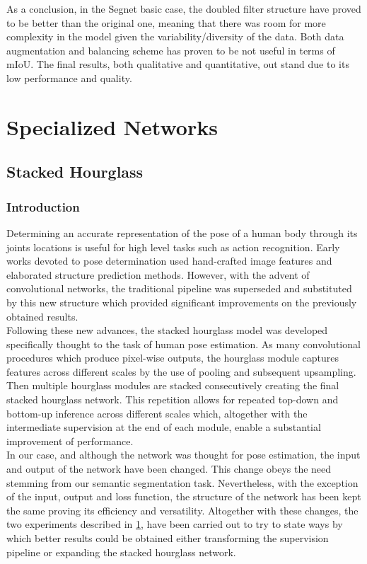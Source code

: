 \documentclass[12pt,a4paper]{article}
\begin{document}
As a conclusion, in the Segnet basic case, the doubled filter structure have proved to be better than the original one, meaning that there was room for more complexity in the model given the variability/diversity of the data. Both data augmentation and balancing scheme has proven to be not useful in terms of mIoU. The final results, both qualitative and quantitative, out stand due to its low performance and quality.\newline
 
 
\newpage
\section{Specialized Networks}\label{specificstudy}


\subsection{Stacked Hourglass}

\subsubsection{Introduction}

Determining an accurate representation of the pose of a human body through its joints locations is useful for high level tasks such as action recognition. Early works devoted to pose determination used hand-crafted image features and elaborated structure prediction methods. However, with the advent of convolutional networks, the traditional pipeline was superseded and substituted by this new structure which provided significant improvements on the previously obtained results.\\

Following these new advances, the stacked hourglass model was developed specifically thought to the task of human pose estimation. As many convolutional procedures which produce pixel-wise outputs, the hourglass module captures features across different scales by the use of pooling and subsequent upsampling. Then multiple hourglass modules are stacked consecutively creating the final stacked hourglass network. This repetition allows for repeated top-down and bottom-up inference across different scales which, altogether with the intermediate supervision at the end of each module, enable a substantial improvement of performance.\\

In our case, and although the network was thought for pose estimation, the input and output of the network have been changed. This change obeys the need stemming from our semantic segmentation task. Nevertheless, with the exception of the input, output and loss function, the structure of the network has been kept the same proving its efficiency and versatility. Altogether with these changes, the two experiments described in \ref{specificstudy}, have been carried out to try to state ways by which better results could be obtained either transforming the supervision pipeline or expanding the stacked hourglass network.\\
\end{document}
